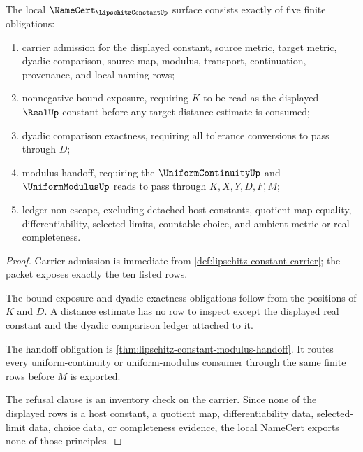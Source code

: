\begin{theorem}\label{thm:lipschitz-constant-namecert-obligation-surface}
The local $\NameCert_{\LipschitzConstantUp}$ surface consists exactly of five finite obligations:
\begin{enumerate}
\item carrier admission for the displayed constant, source metric, target metric, dyadic comparison, source map, modulus, transport, continuation, provenance, and local naming rows;
\item nonnegative-bound exposure, requiring $K$ to be read as the displayed $\RealUp$ constant before any target-distance estimate is consumed;
\item dyadic comparison exactness, requiring all tolerance conversions to pass through $D$;
\item modulus handoff, requiring the $\UniformContinuityUp$ and $\UniformModulusUp$ reads to pass through $K,X,Y,D,F,M$;
\item ledger non-escape, excluding detached host constants, quotient map equality, differentiability, selected limits, countable choice, and ambient metric or real completeness.
\end{enumerate}
\end{theorem}
\begin{proof}
Carrier admission is immediate from \autoref{def:lipschitz-constant-carrier}; the packet exposes exactly the ten listed rows.

The bound-exposure and dyadic-exactness obligations follow from the positions of $K$ and $D$. A distance estimate has no row to inspect except the displayed real constant and the dyadic comparison ledger attached to it.

The handoff obligation is \autoref{thm:lipschitz-constant-modulus-handoff}. It routes every uniform-continuity or uniform-modulus consumer through the same finite rows before $M$ is exported.

The refusal clause is an inventory check on the carrier. Since none of the displayed rows is a host constant, a quotient map, differentiability data, selected-limit data, choice data, or completeness evidence, the local NameCert exports none of those principles.
\end{proof}

